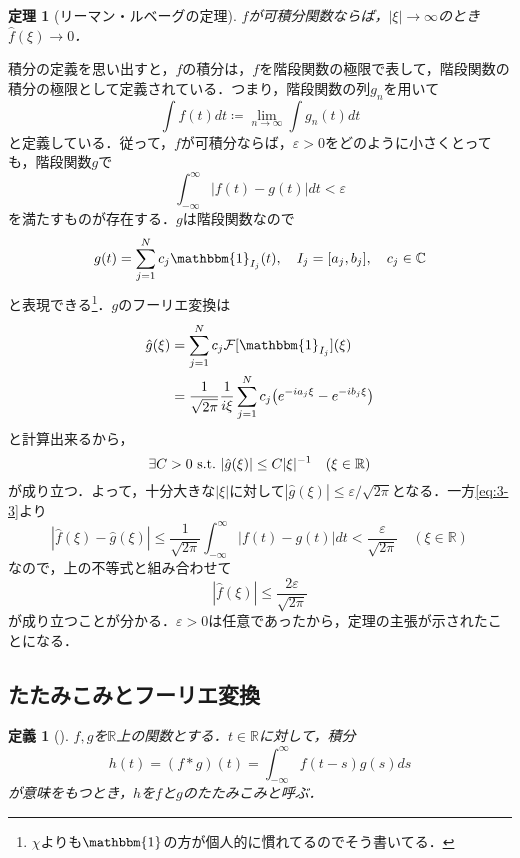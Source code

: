 \documentclass[dvipdfmx,a4j,10pt]{jsarticle}
\makeatletter
\theoremstyle{mystyle1}
\newtheorem{theorem}{定理}[section]
\theoremstyle{mystyle3}
\theoremstyle{mystyle4}
\theoremstyle{mystyle6}
\newtheorem{definition}{定義}[section]
\theoremstyle{mystyle2}
\theoremstyle{mystyle5}
\renewenvironment{proof}[1][\proofname]{\par
  \pushQED{\qed}%
  \normalfont
  \topsep6\p@\@plus6\p@ \trivlist
  \item[\hskip\labelsep{\bfseries\sffamily #1}]\ignorespaces
}{%
  \popQED\endtrivlist\@endpefalse
}
\renewcommand\proofname{証明}
\newenvironment{dfn}[1][]
{\begin{tcolorbox}[
    enhanced,
    boxrule=0pt,
    arc=0mm,
    frame hidden,
    borderline west={2pt}{-4pt}{green!60!black},
    breakable = true
    ]
    \begin{definition}[#1]
}
{\end{definition}\end{tcolorbox}}
\newenvironment{thm}[1][]
{\begin{tcolorbox}[
    enhanced,
    boxrule=0pt,
    arc=0mm,
    frame hidden,
    borderline west={2pt}{-4pt}{red},
    breakable = true
    ]
    \begin{theorem}[#1]
}
{\end{theorem}\end{tcolorbox}}
\makeatother
\begin{document}
\begin{thm}[リーマン・ルベーグの定理]\label{thm:3-12}
	$f$が可積分関数ならば，$|\xi|\to\infty$のとき$\hat f(\xi)\to 0$．
\end{thm}

\begin{proof}
	積分の定義を思い出すと，$f$の積分は，$f$を階段関数の極限で表して，階段関数の積分の極限として定義されている．つまり，階段関数の列$g_n$を用いて
	\[
		\int f(t)dt\coloneqq\lim_{n\to\infty}\int g_n(t)dt
	\]
	と定義している．従って，$f$が可積分ならば，$\varepsilon>0$をどのように小さくとっても，階段関数$g$で
	\begin{equation}\label{eq:3-3}
		\int_{-\infty}^\infty|f(t)-g(t)|dt<\varepsilon
	\end{equation}
	を満たすものが存在する．$g$は階段関数なので
	\[
		g(t)=\sum_{j=1}^N c_j\mathbbm{1}_{I_j}(t),\quad I_j=[a_j, b_j],\quad c_j\in\mathbb{C}
	\]
	と表現できる\footnote{$\chi$よりも$\mathbbm{1}$の方が個人的に慣れてるのでそう書いてる．}．$g$のフーリエ変換は
	\[
		\begin{split}
			\hat{g}(\xi)&=\sum_{j=1}^N c_j\mathcal{F}[\mathbbm{1}_{I_j}](\xi) \\
			&=\frac{1}{\sqrt{2\pi}}\frac{1}{i\xi}\sum_{j=1}^N c_j\mleft(e^{-ia_j\xi}-e^{-ib_j\xi}\mright)
		\end{split}
	\]
	と計算出来るから，
	\[
		\exists C>0\ \mathrm{s.t.}\ \mleft|\hat{g}(\xi)\mright|\leq C|\xi|^{-1}\quad(\xi\in\mathbb{R})
	\]
	が成り立つ．よって，十分大きな$|\xi|$に対して$\displaystyle\left|\hat{g}(\xi)\right|\leq\varepsilon/\sqrt{2\pi}$となる．一方\eqref{eq:3-3}より
	\[
		\left|\hat{f}(\xi)-\hat{g}(\xi)\right|\leq\frac{1}{\sqrt{2\pi}}\int_{-\infty}^\infty|f(t)-g(t)|dt<\frac{\varepsilon}{\sqrt{2\pi}}\quad(\xi\in\mathbb{R})
	\]
	なので，上の不等式と組み合わせて
	\[
		\left|\hat{f}(\xi)\right|\leq\frac{2\varepsilon}{\sqrt{2\pi}}
	\]
	が成り立つことが分かる．$\varepsilon>0$は任意であったから，定理の主張が示されたことになる．
\end{proof}

\subsection{たたみこみとフーリエ変換}

\begin{dfn}\label{dfn:3-4}
	$f,g$を$\mathbb{R}$上の関数とする．$t\in\mathbb{R}$に対して，積分
	\[
		h(t)=(f*g)(t)=\int_{-\infty}^\infty f(t-s)g(s)ds
	\]
	が意味をもつとき，$h$を$f$と$g$のたたみこみと呼ぶ．
\end{dfn}
\end{document}
